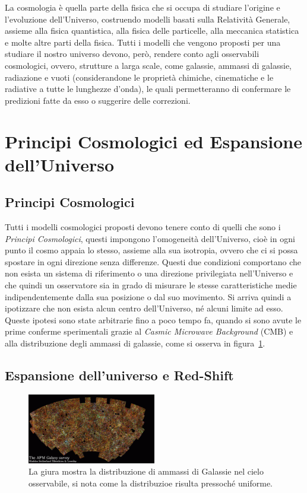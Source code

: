 La cosmologia è quella parte della fisica che si occupa di studiare l'origine e l'evoluzione dell'Universo, costruendo modelli basati sulla Relatività Generale, assieme alla fisica quantistica, alla fisica delle particelle, alla meccanica statistica e molte altre parti della fisica. Tutti i modelli che vengono proposti per una studiare il nostro universo devono, però, rendere conto agli osservabili cosmologici, ovvero, strutture a larga scale, come galassie, ammassi di galassie, radiazione e vuoti (considerandone le proprietà chimiche, cinematiche e le radiative a tutte le lunghezze d'onda), le quali permetteranno di confermare le predizioni fatte da esso o suggerire delle correzioni.
\section{Principi Cosmologici ed Espansione dell'Universo}\label{sec:principi-espansione}
\subsection{Principi Cosmologici}\label{sec:principi-cosmologici}

Tutti i modelli cosmologici proposti devono tenere conto di quelli che sono i \textit{Principi Cosmologici}, questi impongono l'omogeneità dell'Universo, cioè in ogni punto il cosmo appaia lo stesso, assieme alla sua isotropia, ovvero che ci si possa spostare in ogni direzione senza differenze. Questi due condizioni comportano che non esista un sistema di riferimento o una direzione privilegiata nell'Universo e che quindi un osservatore sia in grado di misurare le stesse caratteristiche medie indipendentemente dalla sua posizione o dal suo movimento. Si arriva quindi a ipotizzare che non esista alcun centro dell'Universo, né alcuni limite ad esso. Queste ipotesi sono state arbitrarie fino a poco tempo fa, quando si sono avute le prime conferme sperimentali grazie al \textit{Casmic Microwave Background} (CMB) e alla distribuzione degli ammassi di galassie, come si osserva in figura~\ref{fig:APM}.

\subsection{Espansione dell'universo e Red-Shift}\label{sec:espansione}
\begin{figure}
    \centering
    \includegraphics[width=0.5\textwidth]{immagini/APM.png}
    \caption{La giura mostra la distribuzione di ammassi di Galassie nel cielo osservabile, si nota come la distribuzioe risulta pressoché uniforme.}\label{fig:APM}
\end{figure}


